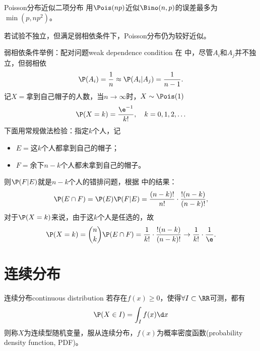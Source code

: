 \begin{theorem}{Poisson分布近似二项分布}{}
	用$\Pois(np)$近似$\Bino(n,p)$的误差最多为$\min(p,np^2)$。
\end{theorem}

\begin{remark}
	若试验不独立，但满足弱相依条件下，Poisson分布仍为较好近似。
\end{remark}

\begin{example}{弱相依条件举例：配对问题}{weak dependence condition}
	在 中，尽管$A_i$和$A_j$并不独立，但弱相依
	\[
		\P(A_i)=\frac1n\approx\P(A_i|A_j)=\frac1{n-1}.
	\]
	记$X=$拿到自己帽子的人数，当$n\to\infty$时，$X\sim\Pois(1)$
	\[
		\P(X=k)=\frac{\e^{-1}}{k!},\quad k=0,1,2,\ldots
	\]
	\tcblower
	下面用常规做法检验：指定$k$个人，记
	\begin{itemize}
		\item $E=$这$k$个人都拿到自己的帽子；
		\item $F=$余下$n-k$个人都未拿到自己的帽子。
	\end{itemize}
	则$\P(F|E)$就是$n-k$个人的错排问题，根据 中的结果：
	\[
		\P(E\cap F)=\P(E)\P(F|E)=\frac{(n-k)!}{n!}\cdot\frac{!(n-k)}{(n-k)!},
	\]
	对于$\P(X=k)$来说，由于这$k$个人是任选的，故
	\[
		\P(X=k)=\binom nk\P(E\cap F)=\frac1{k!}\cdot\frac{!(n-k)}{(n-k)!}\to\frac{1}{k!}\cdot\frac1{\e}.
	\]
\end{example}

\section{连续分布}

\begin{definition}{连续分布}{continuous distribution}
	若存在$f(x)\geqslant 0$，使得$\forall I\subset\RR$可测，都有
	\[
		\P(X\in I)=\int_If(x)\d x
	\]
	则称$X$为连续型随机变量，服从连续分布，$f(x)$为概率密度函数(probability density function, PDF)。
\end{definition}

